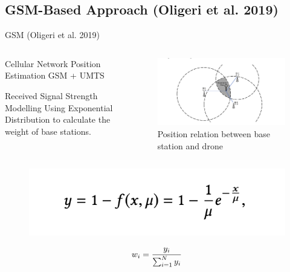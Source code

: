 \documentclass[aspectratio=169, 8pt]{beamer}
\begin{document}
\subsection{GSM-Based Approach (Oligeri et al. 2019)}
\begin{frame}{GSM (Oligeri et al. 2019)}
\begin{columns}[T]
    \begin{column}{0.5\linewidth}
    
    \begin{block}{Cellular Network Position Estimation}
                GSM + UMTS
    \end{block}
    
    \begin{block}{Received Signal Strength Modelling}
                Using Exponential Distribution to calculate the weight of base stations.
    \end{block}        
    
    \end{column}

    \begin{column}{0.5\linewidth}

\begin{figure}
            \centering
            \includegraphics[width = 0.5 \textwidth]{images/basestation.png}
            \caption{Position relation between base station and drone}
            \label{fig:bs}
        \end{figure}

    
    \end{column}
\end{columns}
\begin{figure}
            \centering
            \includegraphics[width = 0.4 \textwidth]{images/expo.png}
            \label{fig:expo}
        \end{figure}
\begin{equation}
    \large w_i=\frac{y_i}{\sum_{i=1}^{N}y_i}
\end{equation}
\end{frame}
\end{document}
